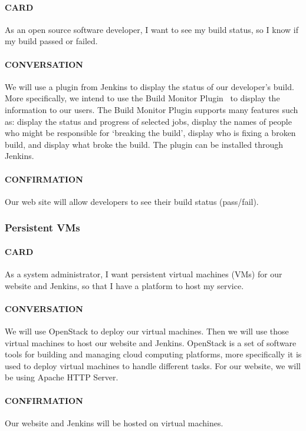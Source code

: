 \documentclass[10pt,letterpaper,onecolumn,draftclsnofoot]{IEEEtran}
\begin{document}
\paragraph{CARD}
As an open source software developer, I want to see my build status, so I know if my build passed or failed.
\paragraph{CONVERSATION}
We will use a plugin from Jenkins to display the status of our developer's build. More specifically, we intend to use the Build Monitor Plugin~\cite{buildmonitor} to display the information to our users. The Build Monitor Plugin supports many features such as: display the status and progress of selected jobs, display the names of people who might be responsible for `breaking the build', display who is fixing a broken build, and display what broke the build. The plugin can be installed through Jenkins.
\paragraph{CONFIRMATION}
Our web site will allow developers to see their build status (pass/fail).

\subsubsection{Persistent VMs}
\paragraph{CARD}
As a system administrator, I want persistent virtual machines (VMs) for our website and Jenkins, so that I have a platform to host my service.
\paragraph{CONVERSATION}
We will use OpenStack to deploy our virtual machines. Then we will use those virtual machines to host our website and Jenkins. OpenStack is a set of software tools for building and managing cloud computing platforms, more specifically it is used to deploy virtual machines to handle different tasks. For our website, we will be using Apache HTTP Server.
\paragraph{CONFIRMATION}
Our website and Jenkins will be hosted on virtual machines.
\end{document}
